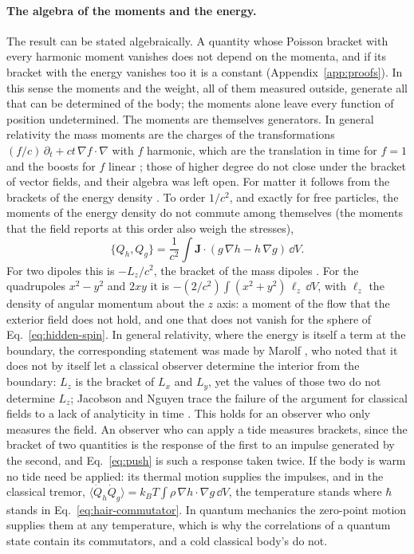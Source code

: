 \paragraph{The algebra of the moments and the energy.} The result can be stated
algebraically. A
quantity whose Poisson bracket with every harmonic moment vanishes does not
depend on the momenta, and if its bracket with the energy vanishes too it is a
constant (Appendix~\ref{app:proofs}). In this sense the moments and the weight, all of them
measured outside, generate all that can be determined of the body; the moments
alone leave every function of position undetermined. The moments are
themselves generators. In general relativity the mass moments are the charges
of the transformations $(f/c)\,\partial_t + ct\,\nabla f\cdot\nabla$
with $f$ harmonic, which are the translation in time for $f = 1$
and the boosts for $f$ linear \cite{CompereOliveriSeraj2018}; those of
higher degree do not close under the bracket of vector fields, and their
algebra was left open. For matter it follows from the brackets of the energy
density \cite{Dirac1962,Schwinger1963}. To order $1/c^2$, and exactly for free particles, the moments of the
energy density do not commute among themselves (the moments that the field
reports at this order also weigh the stresses),
\begin{equation}\label{eq:moment-bracket}
\{Q_h, Q_g\} = \frac{1}{c^2}\int\mathbf J\cdot(g\,\nabla h - h\,\nabla g)\,\dd V .
\end{equation}
For two dipoles this is $-L_z/c^2$, the bracket of the mass dipoles
\cite{Pryce1948}. For the quadrupoles $x^2 - y^2$ and $2xy$ it is
$-(2/c^2)\int(x^2 + y^2)\,\ell_z\,\dd V$, with $\ell_z$ the density of angular
momentum about the $z$ axis: a moment of the flow that the exterior field does
not hold, and one that does not vanish for the sphere of
Eq.~\eqref{eq:hidden-spin}. In general relativity, where the
energy is itself a term at the boundary, the corresponding statement was made by Marolf
\cite{Marolf2009,Marolf2014}, who noted that it does not by itself let a classical
observer determine the interior from the boundary:
$L_z$ is the bracket of
$L_x$ and $L_y$, yet the values of those two do not determine $L_z$; Jacobson
and Nguyen trace the failure of the argument for classical fields to a lack of
analyticity in time \cite{JacobsonNguyen2019}. This holds
for an observer who only measures the field. An observer who can apply a tide
measures brackets, since the bracket of two quantities is the response of the
first to an impulse generated by
the second, and Eq.~\eqref{eq:push} is such a response taken twice. If the body
is warm no tide need be applied: its thermal motion supplies the impulses, and in the
classical tremor, $\langle\dot Q_h\dot Q_g\rangle = k_BT\int\rho\,\nabla h\cdot\nabla g\,\dd V$,
the temperature stands where $\hbar$ stands in
Eq.~\eqref{eq:hair-commutator}. In quantum mechanics the zero-point motion
supplies them at any temperature, which is why the correlations of
a quantum state contain its commutators, and a cold classical body's do not.

